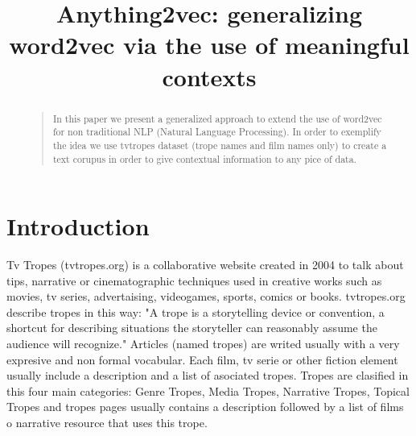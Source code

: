 \documentclass[letterpaper]{article}
\title{Anything2vec: generalizing word2vec via the use of meaningful contexts}
\begin{document}
 
\maketitle
\begin{abstract}
\begin{quote}
In this paper we present a generalized approach to extend the use of word2vec for non traditional NLP (Natural Language Processing). In order to exemplify the idea we use tvtropes dataset (trope names and film names only) to create a text corupus in order to give contextual information to any pice of data.
\end{quote}
\end{abstract}

\section{Introduction}


Tv Tropes (tvtropes.org) is a collaborative website created in 2004 to talk about tips, narrative or cinematographic techniques used in creative works such as movies, tv series, advertaising, videogames, sports, comics or books. tvtropes.org describe tropes in this way: "A trope is a storytelling device or convention, a shortcut for describing situations the storyteller can reasonably assume the audience will recognize." Articles (named tropes) are writed usually with a very expresive and non formal vocabular. Each film, tv serie or other fiction element usually include a description and a list of asociated tropes. Tropes are clasified in this four main categories: Genre Tropes, Media Tropes, Narrative Tropes, Topical Tropes and tropes pages usually contains a description followed by a list of films o narrative resource that uses this trope.   




\end{document}
